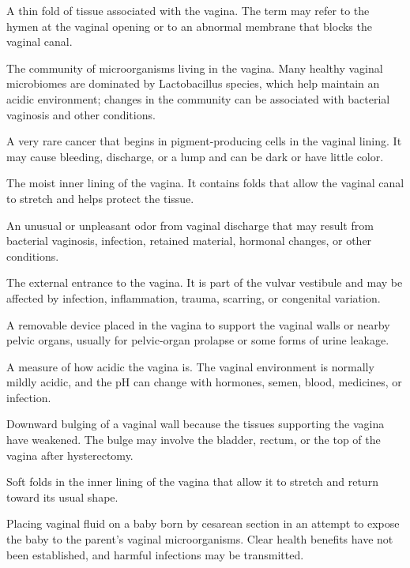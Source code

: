  A thin fold of tissue associated with the vagina. The term may refer to the hymen at the vaginal opening or to an abnormal membrane that blocks the vaginal canal.

 The community of microorganisms living in the vagina. Many healthy vaginal microbiomes are dominated by Lactobacillus species, which help maintain an acidic environment; changes in the community can be associated with bacterial vaginosis and other conditions.

 A very rare cancer that begins in pigment-producing cells in the vaginal lining. It may cause bleeding, discharge, or a lump and can be dark or have little color.

 The moist inner lining of the vagina. It contains folds that allow the vaginal canal to stretch and helps protect the tissue.

 An unusual or unpleasant odor from vaginal discharge that may result from bacterial vaginosis, infection, retained material, hormonal changes, or other conditions.

 The external entrance to the vagina. It is part of the vulvar vestibule and may be affected by infection, inflammation, trauma, scarring, or congenital variation.

 A removable device placed in the vagina to support the vaginal walls or nearby pelvic organs, usually for pelvic-organ prolapse or some forms of urine leakage.

 A measure of how acidic the vagina is. The vaginal environment is normally mildly acidic, and the pH can change with hormones, semen, blood, medicines, or infection.

 Downward bulging of a vaginal wall because the tissues supporting the vagina have weakened. The bulge may involve the bladder, rectum, or the top of the vagina after hysterectomy.

 Soft folds in the inner lining of the vagina that allow it to stretch and return toward its usual shape.

 Placing vaginal fluid on a baby born by cesarean section in an attempt to expose the baby to the parent’s vaginal microorganisms. Clear health benefits have not been established, and harmful infections may be transmitted.

